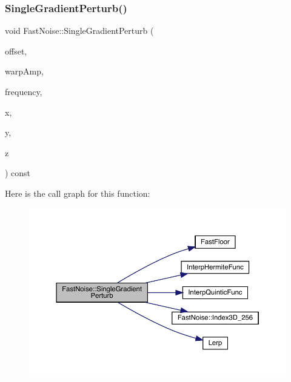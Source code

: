 \subsubsection{\texorpdfstring{Single\+Gradient\+Perturb()}{SingleGradientPerturb()}\hspace{0.1cm}{\footnotesize\ttfamily [2/2]}}
{\footnotesize\ttfamily void Fast\+Noise\+::\+Single\+Gradient\+Perturb (\begin{DoxyParamCaption}\item[{unsigned char}]{offset,  }\item[{\mbox{\hyperlink{_fast_noise_8h_a75a9ef6d2541c4921815b885bfd449c3}{F\+N\+\_\+\+D\+E\+C\+I\+M\+AL}}}]{warp\+Amp,  }\item[{\mbox{\hyperlink{_fast_noise_8h_a75a9ef6d2541c4921815b885bfd449c3}{F\+N\+\_\+\+D\+E\+C\+I\+M\+AL}}}]{frequency,  }\item[{\mbox{\hyperlink{_fast_noise_8h_a75a9ef6d2541c4921815b885bfd449c3}{F\+N\+\_\+\+D\+E\+C\+I\+M\+AL}} \&}]{x,  }\item[{\mbox{\hyperlink{_fast_noise_8h_a75a9ef6d2541c4921815b885bfd449c3}{F\+N\+\_\+\+D\+E\+C\+I\+M\+AL}} \&}]{y,  }\item[{\mbox{\hyperlink{_fast_noise_8h_a75a9ef6d2541c4921815b885bfd449c3}{F\+N\+\_\+\+D\+E\+C\+I\+M\+AL}} \&}]{z }\end{DoxyParamCaption}) const\hspace{0.3cm}{\ttfamily [private]}}

Here is the call graph for this function\+:
\nopagebreak
\begin{figure}[H]
\begin{center}
\leavevmode
\includegraphics[width=350pt]{class_fast_noise_ac584dcaa35fdc6d8af986eba0d3ed50e_cgraph}
\end{center}
\end{figure}
\mbox{\label{class_fast_noise_a2dd412856eb0d588fe8fbcb529517455}} 
